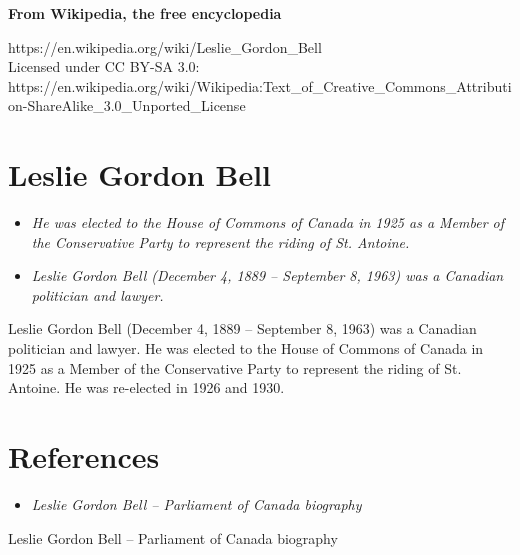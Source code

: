 \textbf{From Wikipedia, the free encyclopedia}

https://en.wikipedia.org/wiki/Leslie\_Gordon\_Bell\\
Licensed under CC BY-SA 3.0:\\
https://en.wikipedia.org/wiki/Wikipedia:Text\_of\_Creative\_Commons\_Attribution-ShareAlike\_3.0\_Unported\_License

\section{Leslie Gordon Bell}\label{leslie-gordon-bell}

\begin{itemize}
\item
  \emph{He was elected to the House of Commons of Canada in 1925 as a
  Member of the Conservative Party to represent the riding of St.
  Antoine.}
\item
  \emph{Leslie Gordon Bell (December 4, 1889 -- September 8, 1963) was a
  Canadian politician and lawyer.}
\end{itemize}

Leslie Gordon Bell (December 4, 1889 -- September 8, 1963) was a
Canadian politician and lawyer. He was elected to the House of Commons
of Canada in 1925 as a Member of the Conservative Party to represent the
riding of St. Antoine. He was re-elected in 1926 and 1930.

\section{References}\label{references}

\begin{itemize}
\item
  \emph{Leslie Gordon Bell -- Parliament of Canada biography}
\end{itemize}

Leslie Gordon Bell -- Parliament of Canada biography
